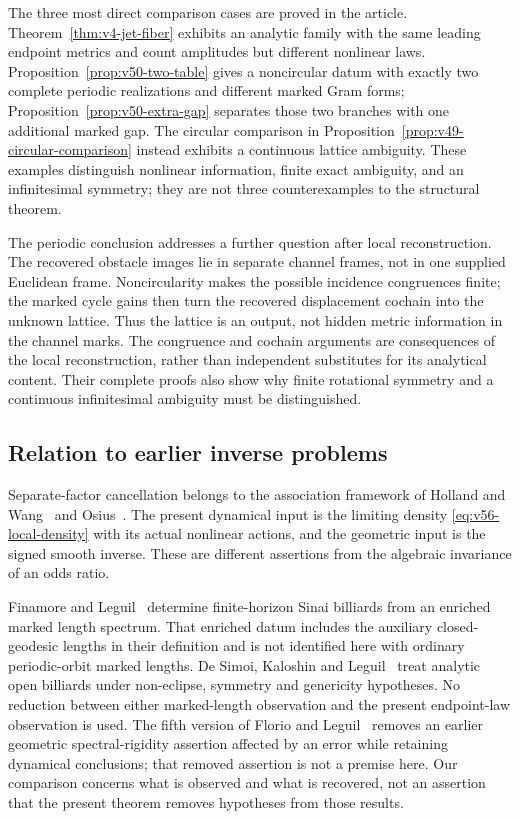 The three most direct comparison cases are proved in the article.
Theorem~\ref{thm:v4-jet-fiber} exhibits an analytic family with the same
leading endpoint metrics and count amplitudes but different nonlinear
laws.  Proposition~\ref{prop:v50-two-table} gives a noncircular datum
with exactly two complete periodic realizations and different marked
Gram forms; Proposition~\ref{prop:v50-extra-gap} separates those two
branches with one additional marked gap.  The circular comparison in
Proposition~\ref{prop:v49-circular-comparison} instead exhibits a
continuous lattice ambiguity.  These examples distinguish nonlinear
information, finite exact ambiguity, and an infinitesimal symmetry;
they are not three counterexamples to the structural theorem.

The periodic conclusion addresses a further question after local
reconstruction.  The recovered obstacle images lie in separate channel
frames, not in one supplied Euclidean frame.  Noncircularity makes the
possible incidence congruences finite; the marked cycle gains then turn
the recovered displacement cochain into the unknown lattice.  Thus the
lattice is an output, not hidden metric information in the channel marks.
The congruence and cochain arguments are consequences of the local
reconstruction, rather than independent substitutes for its analytical
content.  Their complete proofs also show why finite rotational symmetry
and a continuous infinitesimal ambiguity must be distinguished.

\subsection{Relation to earlier inverse problems}

Separate-factor cancellation belongs to the association framework of
Holland and Wang~\cite{HollandWang1987} and Osius~\cite{Osius2009}.
The present dynamical input is the limiting density
\eqref{eq:v56-local-density} with its actual nonlinear actions, and the
geometric input is the signed smooth inverse.  These are different
assertions from the algebraic invariance of an odds ratio.

Finamore and Leguil~\cite{FinamoreLeguil} determine finite-horizon Sinai
billiards from an enriched marked length spectrum.  That enriched datum
includes the auxiliary closed-geodesic lengths in their definition and
is not identified here with ordinary periodic-orbit marked lengths.
De Simoi, Kaloshin and Leguil~\cite{DSKL} treat analytic open billiards
under non-eclipse, symmetry and genericity hypotheses.  No reduction
between either marked-length observation and the present endpoint-law
observation is used.  The fifth version of Florio and
Leguil~\cite{FlorioLeguil} removes an earlier geometric spectral-rigidity
assertion affected by an error while retaining dynamical conclusions;
that removed assertion is not a premise here.  Our comparison concerns
what is observed and what is recovered, not an assertion that the present
theorem removes hypotheses from those results.

